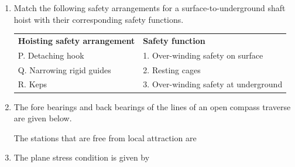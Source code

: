 \documentclass[journal,12pt,onecolumn]{IEEEtran}
\theoremstyle{remark}
\begin{document}
\begin{enumerate}
\item Match the following safety arrangements for a surface-to-underground shaft hoist with their corresponding safety functions.
\begin{center}
\begin{tabular}{ll}
\textbf{Hoisting safety arrangement} & \textbf{Safety function} \\
P. Detaching hook & 1. Over-winding safety on surface \\
Q. Narrowing rigid guides & 2. Resting cages \\
R. Keps & 3. Over-winding safety at underground \\
\end{tabular}
\end{center}

\hfill{}

\begin{enumerate}
\end{enumerate}

\item The fore bearings and back bearings of the lines of an open compass traverse are given below.

The stations that are free from local attraction are

\hfill{}

\begin{enumerate}
\end{enumerate}

\item The plane stress condition is given by

\hfill{}

\begin{enumerate}
\end{enumerate}


\end{enumerate}
\end{document}
